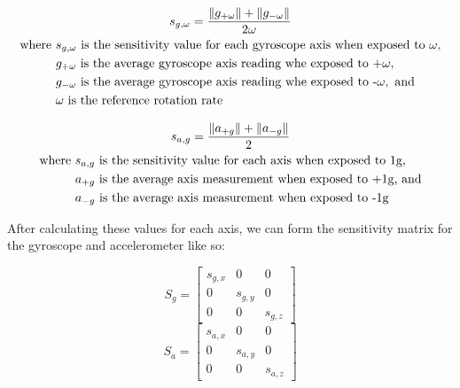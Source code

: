 \begin{gather}
    s_{g, \omega} = \frac{\lVert g_{+\omega}\rVert + \lVert g_{-\omega}\rVert}{2\omega} \\
    \begin{aligned}
        \text{where } & s_{g,\omega} \text{ is the sensitivity value for each gyroscope axis when exposed to } \omega , \\
        & g_{+\omega } \text{ is the average gyroscope axis reading whe exposed to +} \omega ,\\
        & g_{-\omega } \text{ is the average gyroscope axis reading whe exposed to -} \omega , \text{ and} \\
        & \omega \text{ is the reference rotation rate}
    \end{aligned} \notag
\end{gather}

\begin{gather}
    s_{a, g} = \frac{\lVert a_{+g} \rVert + \lVert a_{-g} \rVert}{2} \\
    \begin{aligned}
        \text{where } & s_{a,g} \text{ is the sensitivity value for each axis when exposed to 1g,} \\
        & a_{+g} \text{ is the average axis measurement when exposed to +1g, and} \\
        & a_{-g} \text{ is the average axis measurement when exposed to -1g}
    \end{aligned} \notag
\end{gather}

After calculating these values for each axis, we can form the sensitivity matrix for the gyroscope and accelerometer like so:

\begin{equation*}
    S_g = 
    \begin{bmatrix}
        s_{g,x} & 0 & 0 \\
        0 & s_{g,y} & 0 \\
        0 & 0 & s_{g,z}
    \end{bmatrix} 
\end{equation*}
\begin{equation*}
    S_a =
    \begin{bmatrix}
        s_{a,x} & 0 & 0 \\
        0 & s_{a,y} & 0 \\
        0 & 0 & s_{a,z}
    \end{bmatrix}
\end{equation*}

